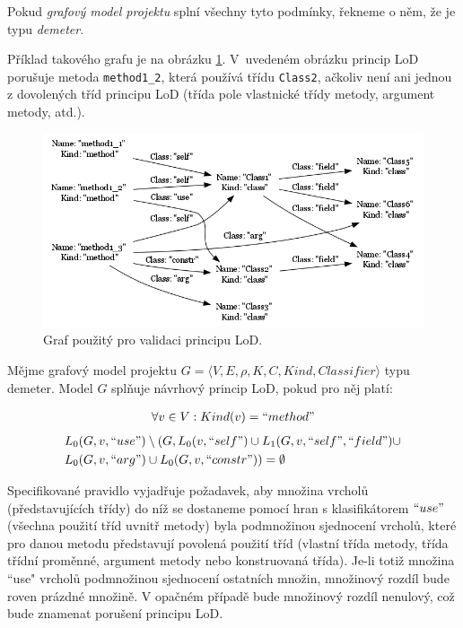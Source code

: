 Pokud \emph{grafový model projektu} splní všechny tyto podmínky, řekneme o něm, že je typu \emph{demeter}.

Příklad takového grafu je na obrázku \ref{implementation-lod_graph}. V~uvedeném obrázku princip LoD porušuje metoda \verb-method1_2-, která používá třídu \verb-Class2-, ačkoliv není ani jednou z dovolených tříd principu LoD (třída pole vlastnické třídy metody, argument metody, atd.).

\begin{figure}[h!]
  \centering
  \includegraphics[width=1.0\textwidth]{./graphs/demeter_graph.png}
  \caption{Graf  použitý pro validaci principu LoD.\label{implementation-lod_graph}}
\end{figure}

\begin{designprinciple}
Mějme grafový model projektu $G = \langle V, E, \rho, K, C, \mathit{Kind}, \mathit{Classifier}\rangle$ typu demeter. Model $G$ splňuje návrhový princip LoD, pokud pro něj platí:

\begin{align*}
\forall v \in V: Kind(v) = ``method"\\
\end{align*}
\begin{align*}
&L_0(G, v, ``use") \setminus (G, L_0(v, ``self") \cup L_1(G, v, ``self", ``field") \cup \\
&L_0(G, v, ``arg") \cup L_0(G, v, ``constr")) = \emptyset
\end{align*}

\end{designprinciple}

Specifikované pravidlo vyjadřuje požadavek, aby množina vrcholů (představujících třídy) do níž se dostaneme pomocí hran s klasifikátorem $``use"$ (všechna použití tříd uvnitř metody) byla podmnožinou sjednocení vrcholů, které pro danou metodu představují povolená použití tříd (vlastní třída metody, třída třídní proměnné, argument metody nebo konstruovaná třída). Je-li totiž množina ``use" vrcholů podmnožinou sjednocení ostatních množin, množinový rozdíl bude roven prázdné množině. V opačném případě bude množinový rozdíl nenulový, což bude znamenat porušení principu LoD.

